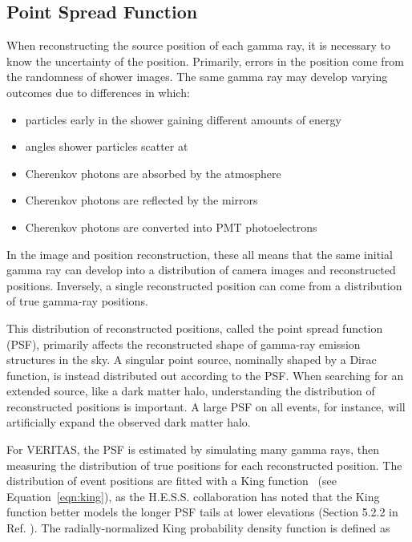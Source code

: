   \FloatBarrier

  \subsection{Point Spread Function}\label{subsec:psf}

    When reconstructing the source position of each gamma ray, it is necessary to know the uncertainty of the position.
    Primarily, errors in the position come from the randomness of shower images.
    The same gamma ray may develop varying outcomes due to differences in which:
    \begin{itemize}[label=$\bullet$,noitemsep]
      \item particles early in the shower gaining different amounts of energy
      \item angles shower particles scatter at
      \item Cherenkov photons are absorbed by the atmosphere
      \item Cherenkov photons are reflected by the mirrors
      \item Cherenkov photons are converted into PMT photoelectrons
    \end{itemize}
    In the image and position reconstruction, these all means that the same initial gamma ray can develop into a distribution of camera images and reconstructed positions.
    Inversely, a single reconstructed position can come from a distribution of true gamma-ray positions.

    This distribution of reconstructed positions, called the point spread function (PSF), primarily affects the reconstructed shape of gamma-ray emission structures in the sky.
    A singular point source, nominally shaped by a Dirac function, is instead distributed out according to the PSF.
    When searching for an extended source, like a dark matter halo, understanding the distribution of reconstructed positions is important.
    A large PSF on all events, for instance, will artificially expand the observed dark matter halo.

    For VERITAS, the PSF is estimated by simulating many gamma rays, then measuring the distribution of true positions for each reconstructed position.
    The distribution of event positions are fitted with a King function~\cite{king1962} (see Equation~\ref{eqn:king}), as the H.E.S.S. collaboration has noted that the King function better models the longer PSF tails at lower elevations (Section 5.2.2 in Ref. \cite{Mayer2015}).
    The radially-normalized King probability density function is defined as

